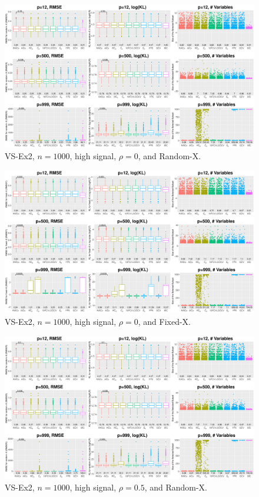 \clearpage
\begin{figure}[!ht]
\centering
\includegraphics[width=\textwidth]{figures/supplement/randomx_VS-Ex2_n1000_hsnr_rho0.eps}
\caption{VS-Ex2, $n=1000$, high signal, $\rho=0$, and Random-X.}
\end{figure}
\begin{figure}[!ht]
\centering
\includegraphics[width=\textwidth]{figures/supplement/fixedx_VS-Ex2_n1000_hsnr_rho0.eps}
\caption{VS-Ex2, $n=1000$, high signal, $\rho=0$, and Fixed-X.}
\end{figure}
\clearpage
\begin{figure}[!ht]
\centering
\includegraphics[width=\textwidth]{figures/supplement/randomx_VS-Ex2_n1000_hsnr_rho05.eps}
\caption{VS-Ex2, $n=1000$, high signal, $\rho=0.5$, and Random-X.}
\end{figure}
